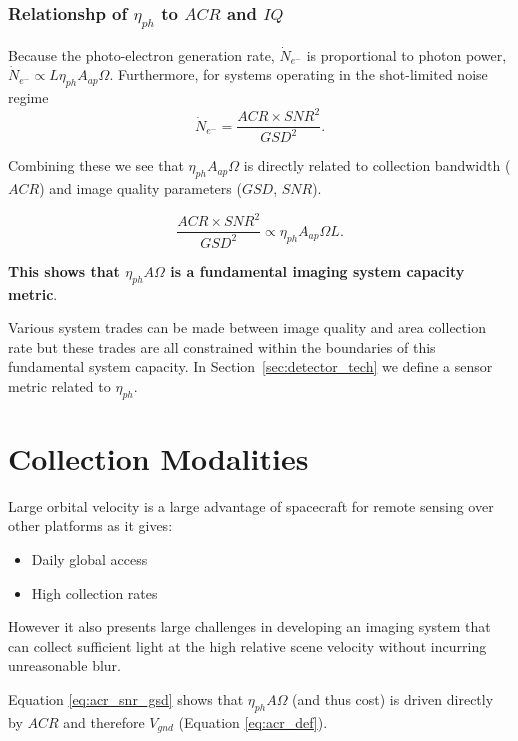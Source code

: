 \documentclass[]{spieman}  %
\begin{document}
\subsubsection{Relationshp of $\eta_{ph}$ to $ACR$ and $IQ$}

Because the photo-electron generation rate, $\dot{N}_{e^-}$ is proportional to photon power, $\dot{N}_{e^-} \propto L\eta_{ph}A_{ap}\Omega$.  Furthermore, for systems operating in the shot-limited noise regime
\begin{equation}
    \dot{N}_{e^-} = \frac{ACR \times SNR^2}{GSD^2}.
\end{equation}

Combining these we see that $\eta_{ph} A_{ap}\Omega$ is directly related to collection bandwidth ($ACR$) and image quality parameters ($GSD$, $SNR$).  

\begin{equation}
\label{eq:acr_snr_gsd}
    \frac{ACR \times SNR^2}{GSD^2} \propto \eta_{ph} A_{ap}\Omega L.
\end{equation}

\textbf{This shows that $\eta_{ph} A \Omega$ is a fundamental imaging system capacity metric}.  

Various system trades can be made between image quality and area collection rate but these trades are all constrained within the boundaries of this fundamental system capacity.  In Section~\ref{sec:detector_tech} we define a sensor metric related to $\eta_{ph}$.

\section{Collection Modalities}
\label{sec:modalities}
Large orbital velocity is a large advantage of spacecraft for remote sensing over other platforms as it gives:

\begin{itemize}
\item Daily global access
\item High collection rates
\end{itemize}

However it also presents large challenges in developing an imaging system that can collect sufficient light at the high relative scene velocity without incurring unreasonable blur.

Equation \eqref{eq:acr_snr_gsd} shows that $\eta_{ph} A \Omega$ (and thus cost) is driven directly by $ACR$ and therefore $V_{gnd}$ (Equation \eqref{eq:acr_def}).
\end{document}
